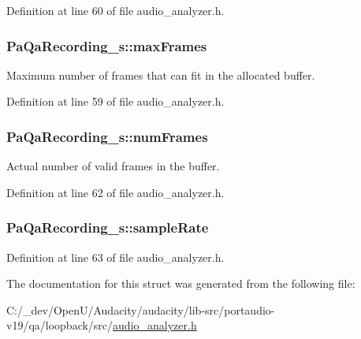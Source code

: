 Definition at line 60 of file audio\+\_\+analyzer.\+h.

\subsubsection[{\texorpdfstring{max\+Frames}{maxFrames}}]{ Pa\+Qa\+Recording\+\_\+s\+::max\+Frames}\hypertarget{struct_pa_qa_recording__s_abbed46e34e27ff432484f20eb6604185}{}\label{struct_pa_qa_recording__s_abbed46e34e27ff432484f20eb6604185}
Maximum number of frames that can fit in the allocated buffer. 

Definition at line 59 of file audio\+\_\+analyzer.\+h.

\subsubsection[{\texorpdfstring{num\+Frames}{numFrames}}]{ Pa\+Qa\+Recording\+\_\+s\+::num\+Frames}\hypertarget{struct_pa_qa_recording__s_a0da5f9ac0c45a0051ce5c50cc1e05731}{}\label{struct_pa_qa_recording__s_a0da5f9ac0c45a0051ce5c50cc1e05731}
Actual number of valid frames in the buffer. 

Definition at line 62 of file audio\+\_\+analyzer.\+h.

\subsubsection[{\texorpdfstring{sample\+Rate}{sampleRate}}]{ Pa\+Qa\+Recording\+\_\+s\+::sample\+Rate}\hypertarget{struct_pa_qa_recording__s_a0a16e04122d6509e3efd524744b1e1df}{}\label{struct_pa_qa_recording__s_a0a16e04122d6509e3efd524744b1e1df}


Definition at line 63 of file audio\+\_\+analyzer.\+h.



The documentation for this struct was generated from the following file\+:\begin{DoxyCompactItemize}
\item 
C\+:/\+\_\+dev/\+Open\+U/\+Audacity/audacity/lib-\/src/portaudio-\/v19/qa/loopback/src/\hyperlink{audio__analyzer_8h}{audio\+\_\+analyzer.\+h}\end{DoxyCompactItemize}
